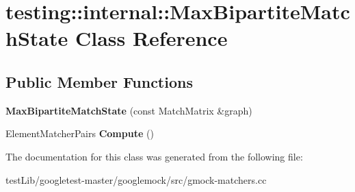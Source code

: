 \hypertarget{classtesting_1_1internal_1_1MaxBipartiteMatchState}{}\section{testing\+:\+:internal\+:\+:Max\+Bipartite\+Match\+State Class Reference}
\label{classtesting_1_1internal_1_1MaxBipartiteMatchState}
\subsection*{Public Member Functions}
\begin{DoxyCompactItemize}
\item 
\mbox{\label{classtesting_1_1internal_1_1MaxBipartiteMatchState_a9d0166d5cc7afd1b741f6c312df72b54}} 
{\bfseries Max\+Bipartite\+Match\+State} (const Match\+Matrix \&graph)
\item 
\mbox{\label{classtesting_1_1internal_1_1MaxBipartiteMatchState_af6efab664ee390925b24d023f1368192}} 
Element\+Matcher\+Pairs {\bfseries Compute} ()
\end{DoxyCompactItemize}


The documentation for this class was generated from the following file\+:\begin{DoxyCompactItemize}
\item 
test\+Lib/googletest-\/master/googlemock/src/gmock-\/matchers.\+cc\end{DoxyCompactItemize}
